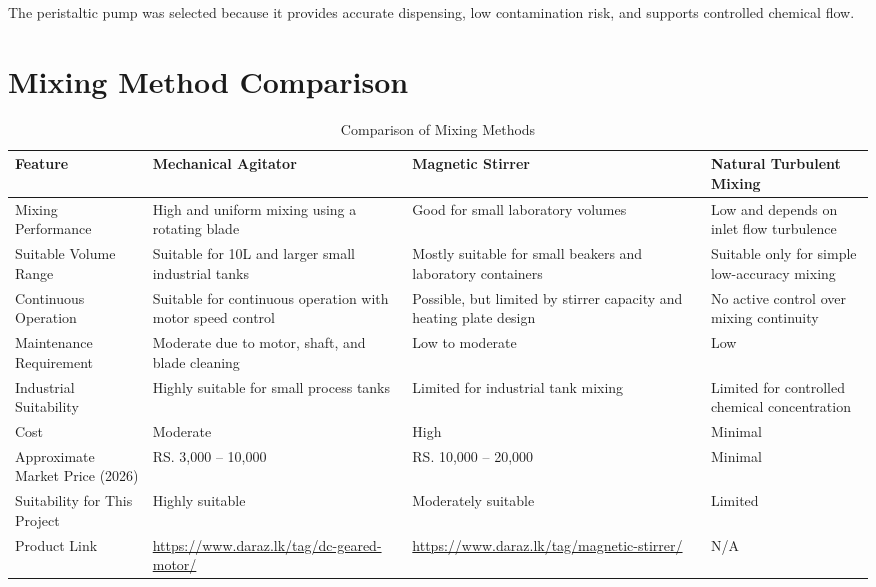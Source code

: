 \documentclass[12pt,a4paper]{report}
\begin{document}
The peristaltic pump was selected because it provides accurate dispensing, low contamination risk, and supports controlled chemical flow.

\section{Mixing Method Comparison}

\begin{table}[H]
\centering
\small
\begin{tabularx}{\textwidth}{|p{3cm}|>{\raggedright\arraybackslash}X|>{\raggedright\arraybackslash}X|>{\raggedright\arraybackslash}X|}
\hline
\textbf{Feature} & \textbf{Mechanical Agitator} & \textbf{Magnetic Stirrer} & \textbf{Natural Turbulent Mixing} \\
\hline

Mixing Performance &
High and uniform mixing using a rotating blade &
Good for small laboratory volumes &
Low and depends on inlet flow turbulence \\
\hline

Suitable Volume Range &
Suitable for 10L and larger small industrial tanks &
Mostly suitable for small beakers and laboratory containers &
Suitable only for simple low-accuracy mixing \\
\hline

Continuous Operation &
Suitable for continuous operation with motor speed control &
Possible, but limited by stirrer capacity and heating plate design &
No active control over mixing continuity \\
\hline

Maintenance Requirement &
Moderate due to motor, shaft, and blade cleaning &
Low to moderate &
Low \\
\hline

Industrial Suitability &
Highly suitable for small process tanks &
Limited for industrial tank mixing &
Limited for controlled chemical concentration \\
\hline

Cost &
Moderate &
High &
Minimal \\
\hline

Approximate Market Price (2026) &
RS. 3,000 -- 10,000 &
RS. 10,000 -- 20,000 &
Minimal \\
\hline

Suitability for This Project &
Highly suitable &
Moderately suitable &
Limited \\
\hline

Product Link &
\url{https://www.daraz.lk/tag/dc-geared-motor/} &
\url{https://www.daraz.lk/tag/magnetic-stirrer/} &
N/A \\
\hline

\end{tabularx}
\caption{Comparison of Mixing Methods}
\end{table}
\end{document}
